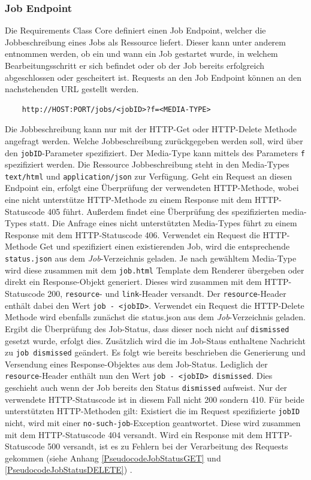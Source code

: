 \subsubsection{Job Endpoint}
Die Requirements Class Core definiert einen Job Endpoint, welcher die Jobbeschreibung eines Jobs als Ressource liefert.
Dieser kann unter anderem entnommen werden, ob ein und wann ein Job gestartet wurde, in welchem Bearbeitungsschritt er sich befindet oder ob der Job bereits 
erfolgreich abgeschlossen oder gescheitert ist. 
Requests an den Job Endpoint können an den nachstehenden URL gestellt werden. 
\begin{center}
\begin{BVerbatim}
    http://HOST:PORT/jobs/<jobID>?f=<MEDIA-TYPE>
\end{BVerbatim}
\end{center}
Die Jobbeschreibung kann nur mit der HTTP-Get oder HTTP-Delete Methode angefragt werden. Welche Jobbeschreibung zurückgegeben werden soll, wird über den \verb|jobID|-Parameter 
spezifiziert.
Der Media-Type kann mittels des Parameters \verb|f| spezifiziert werden. 
Die Ressource Jobbeschreibung steht in den Media-Types \verb|text/html| und \verb|application/json| zur Verfügung.
Geht ein Request an diesen Endpoint ein, erfolgt eine Überprüfung der verwendeten HTTP-Methode, wobei eine nicht unterstütze HTTP-Methode zu einem Response mit dem 
HTTP-Statuscode 405 führt. Außerdem findet eine Überprüfung des spezifizierten media-Types statt. Die Anfrage eines nicht unterstützten Media-Types führt zu einem Response 
mit dem HTTP-Statuscode 406. 
Verwendet ein Request die HTTP-Methode Get und spezifiziert einen existierenden Job, wird die entsprechende \verb|status.json| aus dem \emph{Job}-Verzeichnis geladen. 
Je nach gewähltem Media-Type wird diese zusammen mit dem \verb|job.html| Template dem Renderer übergeben oder direkt ein Response-Objekt generiert.
Dieses wird zusammen mit dem HTTP-Statuscode 200, \verb|resource|- und \verb|link|-Header versandt. Der \verb|resource|-Header enthält dabei den Wert \verb|job - <jobID>|.
Verwendet ein Request die HTTP-Delete Methode wird ebenfalls zunächst die status.json aus dem \emph{Job}-Verzeichnis geladen. Ergibt die Überprüfung des Job-Status, dass 
dieser noch nicht auf \verb|dismissed| gesetzt wurde, erfolgt dies. Zusätzlich wird die im Job-Staus enthaltene Nachricht zu \verb|job dismissed| geändert. 
Es folgt wie bereits beschrieben die Generierung und Versendung eines Response-Objektes aus dem Job-Status. Lediglich der \verb|resource|-Header enthält nun den Wert 
\verb|job - <jobID> dismissed|. Dies geschieht auch wenn der Job bereits den Status \verb|dismissed| aufweist. Nur der verwendete HTTP-Statuscode ist in diesem Fall 
nicht 200 sondern 410. 
Für beide unterstützten HTTP-Methoden gilt: Existiert die im Request spezifizierte \verb|jobID| nicht, wird mit einer \verb|no-such-job|-Exception geantwortet. Diese wird zusammen 
mit dem HTTP-Statuscode 404 versandt. Wird ein Response mit dem HTTP-Statuscode 500 versandt, ist es zu Fehlern bei der Verarbeitung des Requests gekommen 
(siehe Anhang \ref{PseudocodeJobStatusGET} und \ref{PseudocodeJobStatusDELETE}) \cite{code,ogc_api_processes_core}.

